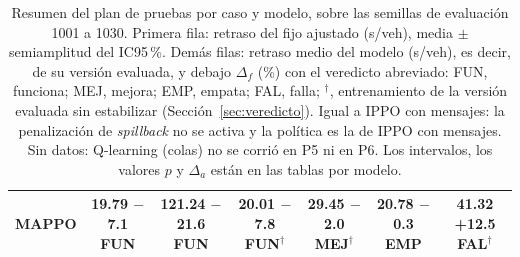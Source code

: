 \begin{table}[H]
\begin{tabular}{lcccccc}
MAPPO & \makecell{19.79\\$-$7.1 FUN} & \makecell{121.24\\$-$21.6 FUN} & \makecell{20.01\\$-$7.8 FUN$^{\dagger}$} & \makecell{29.45\\$-$2.0 MEJ$^{\dagger}$} & \makecell{20.78\\$-$0.3 EMP} & \makecell{41.32\\+12.5 FAL$^{\dagger}$} \\
\bottomrule
\end{tabular}
\caption[Retraso y cambio frente al fijo por caso y modelo]{Resumen del plan de pruebas por caso y modelo, sobre las semillas de evaluación 1001 a 1030. Primera fila: retraso del fijo ajustado (s/veh), media $\pm$ semiamplitud del IC95\,\%. Demás filas: retraso medio del modelo (s/veh), es decir, de su versión evaluada, y debajo $\Delta_f$ (\%) con el veredicto abreviado: FUN, funciona; MEJ, mejora; EMP, empata; FAL, falla; $^{\dagger}$, entrenamiento de la versión evaluada sin estabilizar (Sección~\ref{sec:veredicto}). Igual a IPPO con mensajes: la penalización de \textit{spillback} no se activa y la política es la de IPPO con mensajes. Sin datos: Q-learning (colas) no se corrió en P5 ni en P6. Los intervalos, los valores $p$ y $\Delta_a$ están en las tablas por modelo.}
\label{tab:plan2-resumen}
\end{table}
